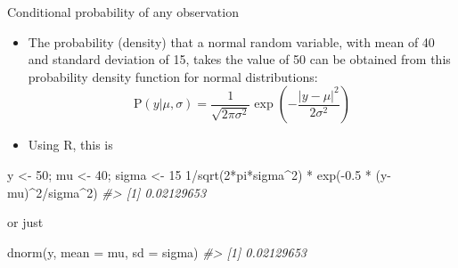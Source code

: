 \documentclass[
  10pt,
  ignorenonframetext,
]{beamer}
\newenvironment{Shaded}{\begin{snugshade}}{\end{snugshade}}
\newcommand{\AttributeTok}[1]{\textcolor[rgb]{0.77,0.63,0.00}{#1}}
\newcommand{\CommentTok}[1]{\textcolor[rgb]{0.56,0.35,0.01}{\textit{#1}}}
\newcommand{\DecValTok}[1]{\textcolor[rgb]{0.00,0.00,0.81}{#1}}
\newcommand{\FloatTok}[1]{\textcolor[rgb]{0.00,0.00,0.81}{#1}}
\newcommand{\FunctionTok}[1]{\textcolor[rgb]{0.00,0.00,0.00}{#1}}
\newcommand{\NormalTok}[1]{#1}
\newcommand{\OtherTok}[1]{\textcolor[rgb]{0.56,0.35,0.01}{#1}}
\newcommand{\SpecialCharTok}[1]{\textcolor[rgb]{0.00,0.00,0.00}{#1}}
\newcommand{\Prob}[1]{\mathrm{P}( #1 )}
\newcommand*{\given}{\vert}
\begin{document}
\begin{frame}[fragile]{Conditional probability of any observation}
\protect\hypertarget{conditional-probability-of-any-observation-2}{}
\begin{itemize}
\item
  The probability (density) that a normal random variable, with mean of
  40 and standard deviation of 15, takes the value of 50 can be obtained
  from this probability density function for normal distributions: \[
  \Prob{y \given \mu, \sigma} = \frac{1}{\sqrt{2\pi\sigma^2}} \exp{\left(-\frac{|y - \mu|^2}{2\sigma^2}\right)}
  \]
\item
  Using R, this is
\end{itemize}

\begin{Shaded}
\begin{Highlighting}[]
\NormalTok{y }\OtherTok{\textless{}{-}} \DecValTok{50}\NormalTok{; mu }\OtherTok{\textless{}{-}} \DecValTok{40}\NormalTok{; sigma }\OtherTok{\textless{}{-}} \DecValTok{15}
\DecValTok{1}\SpecialCharTok{/}\FunctionTok{sqrt}\NormalTok{(}\DecValTok{2}\SpecialCharTok{*}\NormalTok{pi}\SpecialCharTok{*}\NormalTok{sigma}\SpecialCharTok{\^{}}\DecValTok{2}\NormalTok{) }\SpecialCharTok{*} \FunctionTok{exp}\NormalTok{(}\SpecialCharTok{{-}}\FloatTok{0.5} \SpecialCharTok{*}\NormalTok{ (y}\SpecialCharTok{{-}}\NormalTok{mu)}\SpecialCharTok{\^{}}\DecValTok{2}\SpecialCharTok{/}\NormalTok{sigma}\SpecialCharTok{\^{}}\DecValTok{2}\NormalTok{)}
\CommentTok{\#\textgreater{} [1] 0.02129653}
\end{Highlighting}
\end{Shaded}

or just

\begin{Shaded}
\begin{Highlighting}[]
\FunctionTok{dnorm}\NormalTok{(y, }\AttributeTok{mean =}\NormalTok{ mu, }\AttributeTok{sd =}\NormalTok{ sigma)}
\CommentTok{\#\textgreater{} [1] 0.02129653}
\end{Highlighting}
\end{Shaded}
\end{frame}
\end{document}
